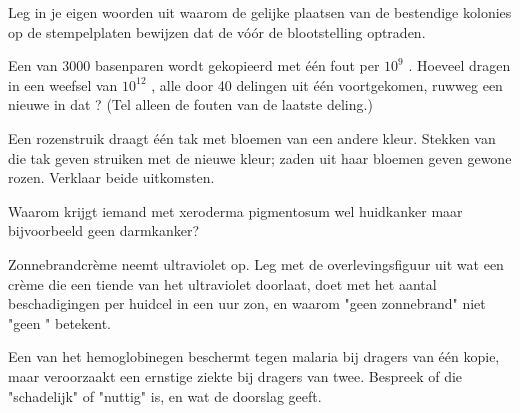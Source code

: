 \begin{exercise}[$\star\star$]\label{exo:g11:mutations:8}
Leg in je eigen woorden uit waarom de gelijke plaatsen van de bestendige
kolonies op de stempelplaten bewijzen dat de  vóór de
blootstelling optraden.
\end{exercise}

\begin{exercise}[$\star\star$]\label{exo:g11:mutations:9}
Een  van \num{3000} basenparen wordt gekopieerd met één fout per
$10^9$ . Hoeveel  dragen in een weefsel van $10^{12}$
, alle door 40 delingen uit één  voortgekomen, ruwweg een nieuwe
 in dat ? (Tel alleen de fouten van de laatste deling.)
\end{exercise}

\begin{exercise}[$\star\star$]\label{exo:g11:mutations:10}
Een rozenstruik draagt één tak met bloemen van een andere kleur. Stekken
van die tak geven struiken met de nieuwe kleur; zaden uit haar bloemen
geven gewone rozen. Verklaar beide uitkomsten.
\end{exercise}

\begin{exercise}[$\star\star$]\label{exo:g11:mutations:11}
Waarom krijgt iemand met xeroderma pigmentosum wel huidkanker maar
bijvoorbeeld geen darmkanker?
\end{exercise}

\begin{exercise}[$\star\star\star$]\label{exo:g11:mutations:12}
Zonnebrandcrème neemt ultraviolet op. Leg met de overlevingsfiguur uit
wat een crème die een tiende van het ultraviolet doorlaat, doet met het
aantal beschadigingen per huidcel in een uur zon, en waarom "geen
zonnebrand" niet "geen " betekent.
\end{exercise}

\begin{exercise}[$\star\star\star$]\label{exo:g11:mutations:13}
Een  van het hemoglobinegen beschermt tegen malaria bij dragers van
één kopie, maar veroorzaakt een ernstige ziekte bij dragers van twee.
Bespreek of die  "schadelijk" of "nuttig" is, en wat de doorslag
geeft.
\end{exercise}

